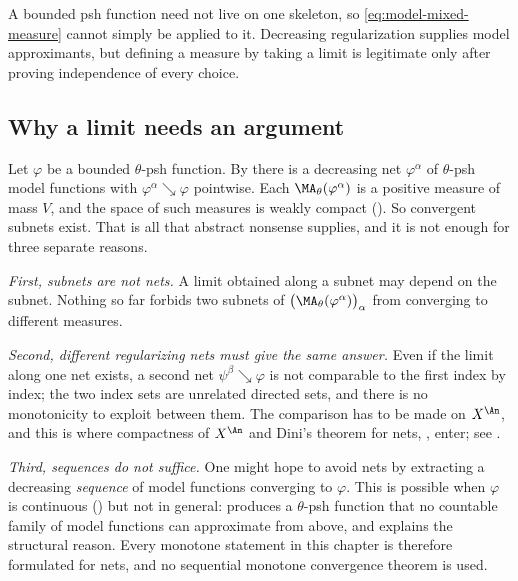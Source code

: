 A bounded psh function need not live on one skeleton, so
\eqref{eq:model-mixed-measure} cannot simply be applied to it. Decreasing
regularization supplies model approximants, but defining a measure by taking
a limit is legitimate only after proving independence of every choice.

\subsection{Why a limit needs an argument}
\label{sec:ch24-why-argument}

Let \(\varphi\) be a bounded \(\theta\)-psh function.  By
 there is a decreasing net
\(\varphi^\alpha\) of \(\theta\)-psh model functions with
\(\varphi^\alpha\searrow\varphi\) pointwise.  Each
\(\MA_\theta(\varphi^\alpha)\) is a positive measure of mass \(V\), and the
space of such measures is weakly compact
().  So convergent subnets exist.  That is
all that abstract nonsense supplies, and it is not enough for three separate
reasons.

\emph{First, subnets are not nets.}  A limit obtained along a subnet may
depend on the subnet.  Nothing so far forbids two subnets of
\(\bigl(\MA_\theta(\varphi^\alpha)\bigr)_\alpha\) from converging to
different measures.

\emph{Second, different regularizing nets must give the same answer.}  Even
if the limit along one net exists, a second net \(\psi^\beta\searrow\varphi\)
is not comparable to the first index by index; the two index sets are
unrelated directed sets, and there is no monotonicity to exploit between
them.  The comparison has to be made on \(X^{\An}\), and this is where
compactness of \(X^{\An}\) and Dini's theorem for nets,
, enter; see .

\emph{Third, sequences do not suffice.}  One might hope to avoid nets by
extracting a decreasing \emph{sequence} of model functions converging to
\(\varphi\).  This is possible when \(\varphi\) is continuous
() but not in general:
 produces a \(\theta\)-psh function that
no countable family of model functions can approximate from above, and
 explains the structural reason.  Every
monotone statement in this chapter is therefore formulated for nets, and no
sequential monotone convergence theorem is used.


